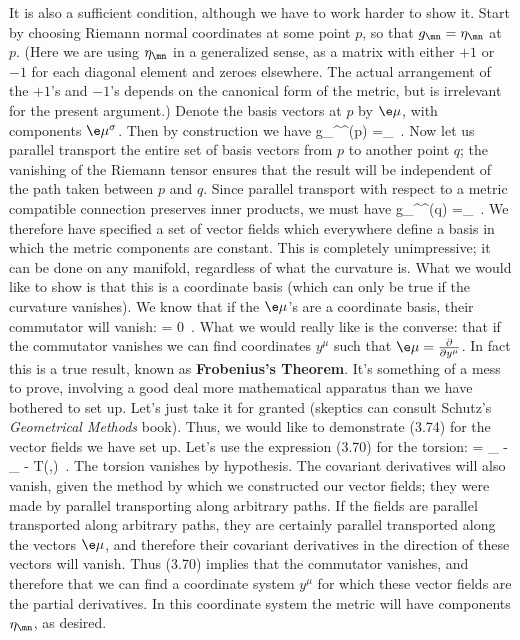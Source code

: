It is also a sufficient condition, although we have to work harder to
show it.  Start by choosing Riemann normal coordinates at some point
$p$, so that $g_\mn = \eta_\mn$ at $p$.  (Here we are using $\eta_\mn$
in a generalized sense, as a matrix with either $+1$ or $-1$ for each
diagonal element and zeroes elsewhere.  The actual arrangement of
the $+1$'s and $-1$'s depends on the canonical form of the metric, but
is irrelevant for the present argument.)  Denote the basis vectors at
$p$ by $\e\mu$, with components $\e\mu^\sigma$.  Then by construction
we have
\be
  g_{\sigma\rho}\e\mu^\sigma \e\nu^\rho (p) =\eta_\mn\ .\label{3.72}
\ee
Now let us parallel transport the entire set of basis vectors from
$p$ to another point $q$; the vanishing of the Riemann tensor ensures
that the result will be independent of the path taken between $p$
and $q$.  Since parallel transport with respect to a metric compatible
connection preserves inner products, we must have
\be
  g_{\sigma\rho}\e\mu^\sigma \e\nu^\rho (q) =\eta_\mn\ .\label{3.73}
\ee
We therefore have specified a set of vector fields which
everywhere define a basis in which the metric components are constant.
This is completely unimpressive; it can be done on any manifold,
regardless of what the curvature is.  What we would like to show
is that this is a coordinate basis (which can only be true
if the curvature vanishes).
We know that if the $\e\mu$'s are a coordinate basis, their
commutator will vanish:
\be
  [\e\mu,\e\nu] = 0\ .\label{3.74}
\ee
What we would really like is the converse: that if the commutator
vanishes we can find coordinates $y^\mu$ such that $\e\mu = {{\partial}
\over{\partial y^\mu}}$.  In fact this is a true result, known as
{\bf Frobenius's Theorem}.  It's something of a mess to prove, involving
a good deal more mathematical apparatus than we have bothered to set
up.  Let's just take it for granted (skeptics can consult Schutz's
{\sl Geometrical Methods} book).  Thus, we would like to demonstrate
(3.74) for the vector fields we have set up.  Let's use the expression
(3.70) for the torsion:
\be
  [\e\mu,\e\nu] = \nabla_{\e\mu} \e\nu - \nabla_{\e\nu}\e\mu
  - T(\e\mu,\e\nu)\ .\label{3.75}
\ee
The torsion vanishes by hypothesis.  The covariant derivatives will
also vanish, given the method by which we constructed our vector fields;
they were made by parallel transporting along arbitrary paths.  If the
fields are parallel transported along arbitrary paths, they are
certainly parallel transported along the vectors $\e\mu$, and therefore
their covariant derivatives in the direction of these vectors will
vanish.  Thus (3.70) implies that the commutator vanishes, and therefore
that we can find a coordinate system $y^\mu$ for which these vector
fields are the partial derivatives.  In this coordinate system the
metric will have components $\eta_\mn$, as desired.

